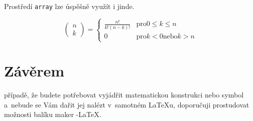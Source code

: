 \documentclass[a4paper, 11pt, twocolumn]{article}
\theoremstyle{definition}
\theoremstyle{definition}
\begin{document}
Prostředí \verb|array| lze úspěšně využít i jinde.

$$
\left(
\begin{array}{c}
n\\
k
\end{array}
\right) =
\left\{
\begin{array}{ll}
\frac{n!}{k!(n-k)!} & \text{pro} 0 \leq k \leq n\\
0 & \text{pro} k < 0 \text{nebo} k > n
\end{array}
\right.
$$

\section{Závěrem}
případě, že budete potřebovat vyjádřit matematickou konstrukci nebo symbol a~nebude se Vám dařit jej nalézt v~samotném \LaTeX u, doporučuji prostudovat možnosti balíku maker \AmS-\LaTeX.
\end{document}
